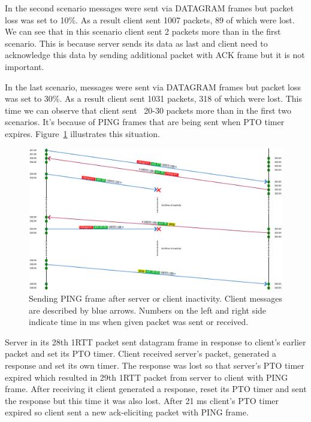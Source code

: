 In the second scenario messages were sent via DATAGRAM frames but packet loss was set to 10\%.
As a result client sent 1007 packets, 89 of which were lost.
We can see that in this scenario client sent 2 packets more than in the first scenario.
This is because server sends its data as last and client need to acknowledge this data by sending additional packet with ACK frame but it is not important.

In the last scenario, messages were sent via DATAGRAM frames but packet loss was set to 30\%.
As a result client sent 1031 packets, 318 of which were lost.
This time we can observe that client sent ~20-30 packets more than in the first two scenarios.
It's because of PING frames that are being sent when PTO timer expires.
Figure~\ref{fig:dgram_ping_frames} illustrates this situation.

\begin{figure}
    \centering
    \includegraphics[width=\textwidth]{img/__09__datagrams/dgram_retransmission_ping.png}
    \caption{Sending PING frame after server or client inactivity.
    Client messages are described by blue arrows.
    Numbers on the left and right side indicate time in ms when given packet was sent or received.}
    \label{fig:dgram_ping_frames}
\end{figure}

Server in its 28th 1RTT packet sent datagram frame in response to client's earlier packet and set its PTO timer.
Client received server's packet, generated a response and set its own timer.
The response was lost so that server's PTO timer expired which resulted in 29th 1RTT packet from server to client with PING frame.
After receiving it client generated a response, reset its PTO timer and sent the response but this time it was also lost.
After 21 ms client's PTO timer expired so client sent a new ack-eliciting packet with PING frame.
